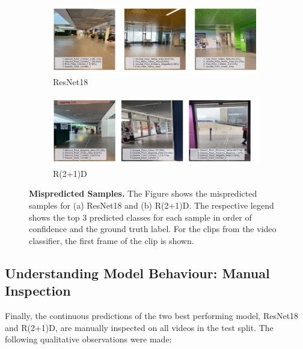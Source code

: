 \documentclass[a4paper]{article}
\begin{document}
  \begin{figure}
      \centering
    \begin{subfigure}[b]{\textwidth}
      \centering
      \includegraphics[width=\textwidth]{./figures/resnet18-mispredicted-frames.png}
      \caption{ResNet18}
    \end{subfigure}
    \begin{subfigure}[b]{\textwidth}
      \centering
      \includegraphics[width=\textwidth]{./figures/r2plus1d-mispredicted-frames.png}
      \caption{R(2+1)D}
    \end{subfigure}
    \caption{\textbf{Mispredicted Samples.} The Figure shows the mispredicted
      samples for (a) ResNet18 and (b) R(2+1)D. The respective legend shows the
      top 3 predicted classes for each sample in order of confidence and the
      ground truth label. For the clips from the video classifier, the first
      frame of the clip is shown.}
    \label{fig:mispredicted}
  \end{figure}
  

  \subsection{Understanding Model Behaviour: Manual Inspection} %
  \label{sub:manual}

  Finally, the continuous predictions of the two best performing model, ResNet18
  and R(2+1)D, are manually inspected on all videos in the test split. The
  following qualitative observations were made:
\end{document}
